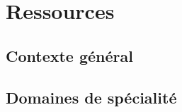 \section{Ressources}
  \subsection{Contexte général}
    

  \subsection{Domaines de spécialité}
    
